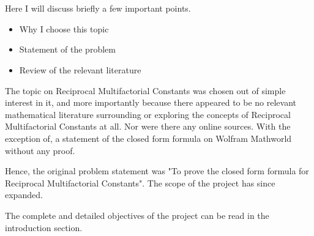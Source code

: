 \documentclass[12pt]{article}
\makeatletter
\numberwithin{equation}{section}
\newcommand\mainmatter{%
    \cleardoublepage
  \pagenumbering{arabic}}
\makeatother
\begin{document}
\section*{}
Here I will discuss briefly a few important points. 
\begin{itemize}
    \item Why I choose this topic
    \item Statement of the problem
    \item Review of the relevant literature
\end{itemize}
\par The topic on Reciprocal Multifactorial Constants was chosen out of simple interest in it, and more importantly because there appeared to be no relevant mathematical literature surrounding or exploring the concepts of Reciprocal Multifactorial Constants at all. Nor were there any online sources. With the exception of, a statement of the closed form formula on Wolfram Mathworld \cite{RMFCwolfram} without any proof.
\par Hence, the original problem statement was "To prove the closed form formula for Reciprocal Multifactorial Constants". The scope of the project has since expanded.
\par The complete and detailed objectives of the project can be read in the introduction section.
\clearpage
\tableofcontents


\mainmatter
\maketitle
\end{document}
